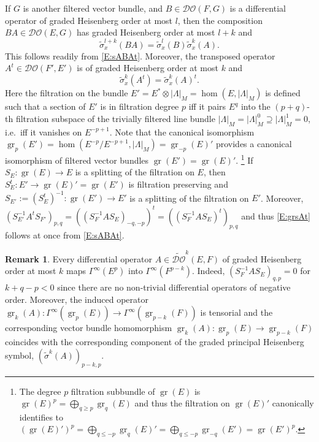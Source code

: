 \documentclass[reqno,12pt]{amsart}
\DeclareMathOperator{\gr}{gr}
\newcommand{\DO}{\mathcal D\mathcal O}
\newcommand{\tDO}{\widetilde{\DO}}
\theoremstyle{plain}
\theoremstyle{definition}
\newtheorem{remark}[theorem]{Remark}
\begin{document}
If $G$ is another filtered vector bundle, and $B\in\DO(F,G)$ is a differential operator of graded Heisenberg order at most $l$, then the composition $BA\in\DO(E,G)$ has graded Heisenberg order at most $l+k$ and 
\begin{equation}\label{E:tsAB}
\tilde\sigma^{l+k}_x(BA)=\tilde\sigma^l_x(B)\tilde\sigma_x^k(A).
\end{equation}
This follows readily from \eqref{E:sABAt}.
Moreover, the transposed operator $A^t\in\DO(F',E')$ is of graded Heisenberg order at most $k$ and
\begin{equation}\label{E:grsAt}
\tilde\sigma^k_x(A^t)=\tilde\sigma_x^k(A)^t.
\end{equation}
Here the filtration on the bundle $E'=E^*\otimes|\Lambda|_M=\hom(E,|\Lambda|_M)$ is defined such that a section of $E'$ is in filtration degree $p$ iff it pairs $E^q$ into the $(p+q)$-th filtration subspace of the trivially filtered line bundle $|\Lambda|_M=|\Lambda|_M^0\supseteq|\Lambda|_M^1=0$, i.e.\ iff it vanishes on $E^{-p+1}$.
Note that the canonical isomorphism $\gr_p(E')=\hom(E^{-p}/E^{-p+1},|\Lambda|_M)=\gr_{-p}(E)'$ provides a canonical isomorphism of filtered vector bundles $\gr(E')=\gr(E)'$.
\footnote{The degree $p$ filtration subbundle of $\gr(E)$ is $\gr(E)^p=\bigoplus_{q\geq p}\gr_q(E)$ and thus the filtration on $\gr(E)'$ canonically identifies to $(\gr(E)')^p=\bigoplus_{q\leq-p}\gr_q(E)'=\bigoplus_{q\leq-p}\gr_{-q}(E')=\gr(E')^p$.}
If $S_E\colon\gr(E)\to E$ is a splitting of the filtration on $E$, then $S_E^t\colon E'\to\gr(E)'=\gr(E')$ is filtration preserving and $S_{E'}:=(S_E^t)^{-1}\colon\gr(E')\to E'$ is a splitting of the filtration on $E'$.
Moreover, $(S_{E'}^{-1}A^tS_{F'})_{p,q}=((S_F^{-1}AS_E)_{-q,-p})^t=((S_F^{-1}AS_E)^t)_{p,q}$ and thus \eqref{E:grsAt} follows at once from \eqref{E:sABAt}.


\begin{remark}\label{R:grsigma}
Every differential operator $A\in\tDO^k(E,F)$ of graded Heisenberg order at most $k$ maps $\Gamma^\infty(E^p)$ into $\Gamma^\infty(F^{p-k})$. 
Indeed, $(S_F^{-1}AS_E)_{q,p}=0$ for $k+q-p<0$ since there are no non-trivial differential operators of negative order.
Moreover, the induced operator $\gr_k(A)\colon\Gamma^\infty(\gr_p(E))\to\Gamma^\infty(\gr_{p-k}(F))$ is tensorial and the corresponding vector bundle homomorphism $\gr_k(A)\colon\gr_p(E)\to\gr_{p-k}(F)$ coincides with the corresponding component of the graded principal Heisenberg symbol, $(\tilde\sigma^k(A))_{p-k,p}$.
\end{remark}
\end{document}
